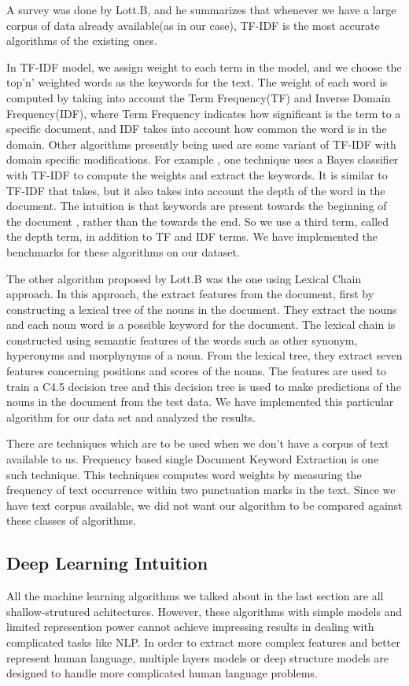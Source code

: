 \documentclass[dvips,9pt]{article}
\begin{document}
		A survey was done by Lott.B\cite{lott2012survey}, and he summarizes that whenever we have a large corpus of data already available(as in our case), TF-IDF is the most accurate algorithms of the existing ones. 
		
		In TF-IDF model, we assign weight to each term in the model, and we choose the top'n' weighted words as the keywords for the text. The weight of each word is computed by taking into account the Term Frequency(TF) and Inverse Domain Frequency(IDF), where Term Frequency indicates how significant is the term to a specific document, and IDF takes into account how common the word is in the domain. 	Other algorithms presently being used are some variant of TF-IDF with domain specific modifications. For example , one technique uses a Bayes classifier with TF-IDF to compute the weights and extract the keywords. It is similar to TF-IDF that takes, but it also takes into account the depth of the word in the document. The intuition is that keywords are present towards the beginning of the document , rather than the towards the end. So we use a third term, called the depth term, in addition to TF and IDF terms. We have implemented the benchmarks for these algorithms on our dataset.
		
		The other algorithm proposed by Lott.B\cite{lott2012survey} was the one using Lexical Chain approach. In this approach, the extract features from the document, first by constructing a lexical tree of the nouns in the document. They extract the nouns and each noun word is a possible keyword for the document. The lexical chain is constructed using semantic features of the words such as other synonym, hyperonyms and morphynyms of a noun. From the lexical tree, they extract seven features concerning positions and scores of the nouns. The features are used to train a C4.5 decision tree and this decision tree is used to make predictions of the nouns in the document from the test data. We have implemented this particular algorithm for our data set and analyzed the results.		

		There are techniques which are to be used when we don't have a corpus of text available to us. Frequency based single Document Keyword Extraction is one such technique. This techniques computes word weights by measuring the frequency of text occurrence within two punctuation marks in the text. Since we have text corpus available, we did not want our algorithm to be compared against these classes of algorithms.
		\subsection{Deep Learning Intuition}
		All the machine learning algorithms we talked about in the last section are all shallow-strutured achitectures. However, these algorithms with simple models and limited represention power cannot achieve impressing results in dealing with complicated tasks like NLP. In order to extract more complex features and better represent human language, multiple layers models or deep structure models are designed to handle more  complicated human language problems\cite{socher2012deep}.
\end{document}
